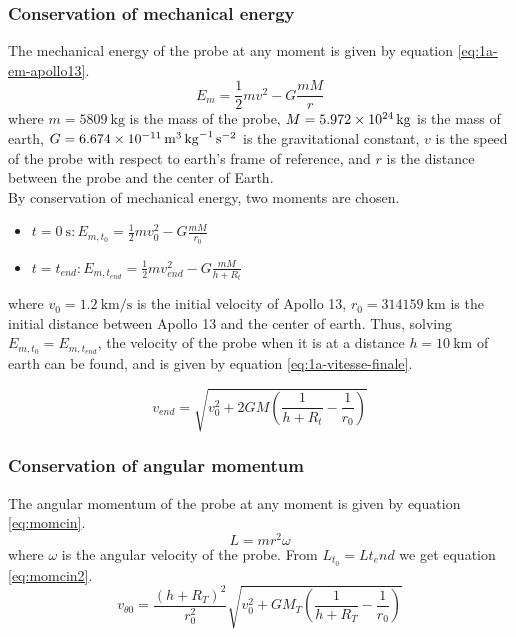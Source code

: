 \documentclass[a4paper,12pt,twoside]{article}
\begin{document}
\subsubsection{Conservation of mechanical energy}
The mechanical energy of the probe at any moment is given by equation \eqref{eq:1a-em-apollo13}.
\begin{equation}
  E_m = \frac{1}{2}mv^2 - G\frac{mM}{r}
  \label{eq:1a-em-apollo13}
\end{equation}
where $m=\SI{5809}{\kilo\gram}$ is the mass of the probe, $M=\SI{5.972d24}{\kilo\gram}$ is the mass of earth, $G=\SI{6.674d-11}{\cubic\meter\per\kilo\gram\per\square\second}$ is the gravitational constant, $v$ is the speed of the probe with respect to earth's frame of reference, and $r$ is the distance between the probe and the center of Earth.\\

By conservation of mechanical energy, two moments are chosen.
\begin{itemize}
  \item $t=\SI{0}{\s}: E_{m,t_0} = \frac{1}{2}mv_0^2 - G\frac{mM}{r_0}$
  \item $t=t_{end}: E_{m,t_{end}} = \frac{1}{2}mv_{end}^2 - G\frac{mM}{h + R_t}$
\end{itemize}
where $v_0 = \SI{1.2}{\kilo\meter\per\second}$ is the initial velocity of Apollo 13, $r_0 = \SI{314159}{\kilo\meter}$ is the initial distance between Apollo 13 and the center of earth.
Thus, solving $E_{m,t_0} = E_{m,t_{end}}$, the velocity of the probe when it is at a distance $h=\SI{10}{\kilo\meter}$ of earth can be found, and is given by equation \eqref{eq:1a-vitesse-finale}.

\begin{equation}
  v_{end} = \sqrt{v_0^2 + 2GM\left(\frac{1}{h + R_t} - \frac{1}{r_0}\right)}
  \label{eq:1a-vitesse-finale}
\end{equation}

\subsubsection{Conservation of angular momentum}
The angular momentum of the probe at any moment is given by equation \eqref{eq:momcin}.
\begin{equation}
L = mr^2 \omega
\label{eq:momcin}
\end{equation}
where $\omega$ is the angular velocity of the probe. From $ L_{t_0} = L{t_end} $ we get equation \eqref{eq:momcin2}.
\begin{equation}
v_{\theta 0} = \frac{(h+R_T)^2}{r_0^2} \sqrt{v_0^2 + G M_T \left(\frac{1}{h+R_T}-\frac{1}{r_0}\right)}
\label{eq:momcin2}
\end{equation}
\end{document}
